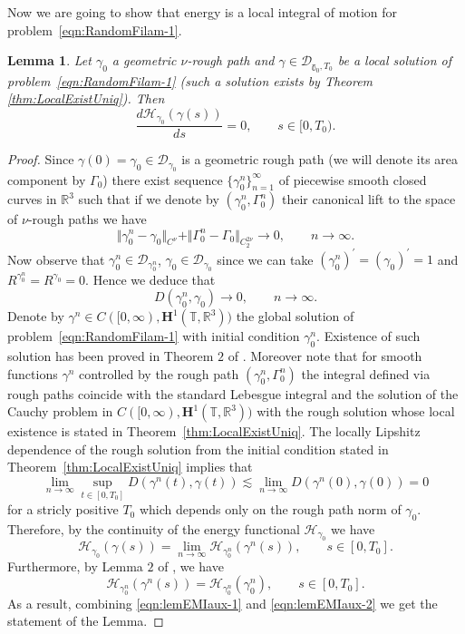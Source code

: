 \documentclass[11pt,a4paper,reqno]{amsart}%
\theoremstyle{plain}
\theoremstyle{remark}
\theoremstyle{plain}
\newtheorem{lemma}[theorem]{Lemma}
\numberwithin{equation}{section}
\def\Rnu{{\mathbb R}}
\def\liml{\lim\limits}
\def\supl{\sup\limits}
\def\supl{\mathop{\sup}\limits}
\begin{document}
Now we are going to show that energy is a local integral of motion
for problem~\eqref{eqn:RandomFilam-1}.
\begin{lemma}\label{lem:EnergyMotionIntegral}
Let $\gamma_0$ a geometric $\nu$-rough path and $\gamma\in\mathcal{D}_{\mathbb{\gamma}_0,T_0}$ be a local solution of
problem~\eqref{eqn:RandomFilam-1} (such a solution exists by Theorem \ref{thm:LocalExistUniq}). Then
$$
\frac{d\mathcal{H}_{\gamma_0}(\gamma(s))}{ds}=0,\qquad s\in[0,T_0).
$$
\end{lemma}
\begin{proof}%
Since $\gamma(0)=\gamma_0\in \mathcal{D}_{\gamma_0}$ is a geometric rough path (we will denote its area component by $\Gamma_0$)
there exist sequence $\{\gamma_0^n\}_{n=1}^{\infty}$ of piecewise smooth closed curves in $\Rnu^3$ such that if we denote by $(\gamma_0^n,\Gamma_0^n)$ their canonical lift to the space of $\nu$-rough paths we have
\[
\Vert \gamma_0^n-\gamma_0\Vert_{C^{\nu}}+\Vert \Gamma^n_0-{\Gamma}_0\Vert_{C_2^{2\nu}}\to 0,\qquad n\to\infty.
\]
Now observe that $\gamma_0^n\in \mathcal{D}_{\gamma_0^n}$, $\gamma_0\in \mathcal{D}_{\gamma_0}$ since we can take
$(\gamma_0^n)^\prime=(\gamma_0)^\prime=1$ and $R^{\gamma_0^n}=R^{\gamma_0}=0$.
Hence we deduce that
$$
D( \gamma_0^n,\gamma_0)\to 0,\qquad n\to\infty.
$$
Denote by $\gamma^n\in C([0,\infty),\mathbf{H}^1(\mathbb{T},\Rnu^3))$ the
global solution of problem~\eqref{eqn:RandomFilam-1} with initial
condition $\gamma_0^n$. Existence of such solution has been proved in
Theorem $2$ of \cite{[Bers+Gub_2007]}. Moreover note that for smooth functions $\gamma^n$ controlled by the rough path $(\gamma_0^n,\Gamma_0^n)$ the integral defined via rough paths coincide with the standard Lebesgue integral and the solution of the Cauchy problem in $C([0,\infty),\mathbf{H}^1(\mathbb{T},\Rnu^3))$ with the rough solution whose local existence is stated in Theorem~\ref{thm:LocalExistUniq}.   The locally Lipshitz dependence of the rough solution from the initial condition  stated in Theorem~\ref{thm:LocalExistUniq} implies that
$$
\lim_{n\to \infty} \supl_{t\in[0,T_0]}D( \gamma^n(t),\gamma(t)) \lesssim  \lim_{n\to \infty}  D( \gamma^n(0),\gamma(0))  =  0
$$
for a stricly positive $T_0$ which depends only on the rough path norm of $\gamma_0$.
Therefore, by the continuity of the energy functional $\mathcal{H}_{\gamma_0}$ we
have
\begin{equation}
\mathcal{H}_{\gamma_0}(\gamma(s))=\liml_{n\to\infty}\mathcal{H}_{\gamma_0^n}(\gamma^n(s)),\qquad s\in[0,T_0].\label{eqn:lemEMIaux-1}
\end{equation}
Furthermore, by Lemma $2$ of \cite{[Bers+Gub_2007]}, we
have
\begin{equation}
\mathcal{H}_{\gamma_0^n}(\gamma^n(s))=\mathcal{H}_{\gamma_0^n}(\gamma_0^n),\qquad s\in[0,T_0].\label{eqn:lemEMIaux-2}
\end{equation}
As a result, combining \eqref{eqn:lemEMIaux-1} and
\eqref{eqn:lemEMIaux-2} we get the statement of the Lemma.
\end{proof}
\end{document}
